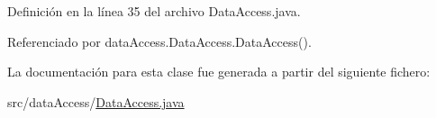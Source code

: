 Definición en la línea 35 del archivo Data\+Access.\+java.



Referenciado por data\+Access.\+Data\+Access.\+Data\+Access().



La documentación para esta clase fue generada a partir del siguiente fichero\+:\begin{DoxyCompactItemize}
\item 
src/data\+Access/\mbox{\hyperlink{DataAccess_8java}{Data\+Access.\+java}}\end{DoxyCompactItemize}
